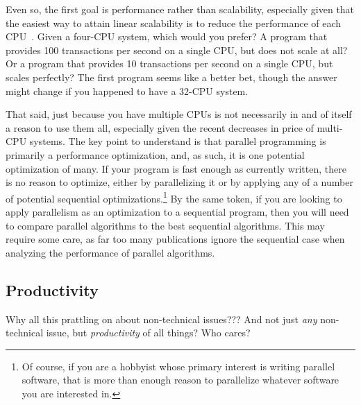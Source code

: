 Even so, the first goal is performance rather than scalability,
especially given that the easiest way to attain linear scalability
is to reduce the performance of each CPU~\cite{LinusTorvalds2001a}.
Given a four-CPU system, which would you prefer?
A program that provides 100 transactions per second on a single CPU,
but does not scale at all?
Or a program that provides 10 transactions per second on a single CPU,
but scales perfectly?
The first program seems like a better bet, though the answer might
change if you happened to have a 32-CPU system.

That said, just because you have multiple CPUs is not necessarily
in and of itself a reason to use them all, especially given the
recent decreases in price of multi-CPU systems.
The key point to understand is that parallel programming is primarily
a performance optimization, and, as such, it is one potential optimization
of many.
If your program is fast enough as currently written, there is no
reason to optimize, either by parallelizing it or by applying any
of a number of potential sequential optimizations.\footnote{
	Of course, if you are a hobbyist whose primary interest is
	writing parallel software, that is more than enough reason to
	parallelize whatever software you are interested in.}
By the same token, if you are looking to apply parallelism as an
optimization to a sequential program, then you will need to compare
parallel algorithms to the best sequential algorithms.
This may require some care, as far too many publications ignore the
sequential case when analyzing the performance of parallel algorithms.

\subsection{Productivity}
\label{sec:intro:Productivity}

\QuickQuiz{}
	Why all this prattling on about non-technical issues???
	And not just \emph{any} non-technical issue, but \emph{productivity}
	of all things?
	Who cares?
 \QuickQuizEnd

